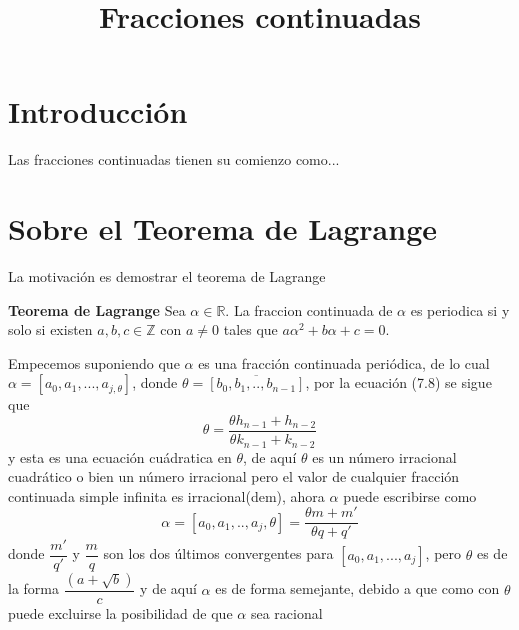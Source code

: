 \documentclass[11pt, article]{article}
\title{Fracciones continuadas}
\author{}
\date{}
\begin{document}
\maketitle
\thispagestyle{empty}
\section*{Introducción}
Las fracciones continuadas tienen su comienzo como...
\section*{Sobre el Teorema de Lagrange}
La motivación es demostrar el teorema de Lagrange

\textbf{Teorema de Lagrange} Sea $\alpha \in \mathbb{R}$. La fraccion continuada de $\alpha$ es periodica si y solo si existen $a, b, c \in\mathbb{Z}$ con $a\not=0$ tales que $a\alpha^2 + b\alpha + c = 0$.

Empecemos suponiendo que $\alpha$ es una fracción continuada periódica, de lo cual $\alpha= [a_0,a_1,...,a_{j,\theta}]$, donde $\theta=\overline{[b_0,b_1,..,b_{n-1}]}$, por la ecuación (7.8) se sigue que
\[
\theta =\dfrac{\theta h_{n-1}+h_{n-2}}{\theta k_{n-1}+k_{n-2}}
\]
y esta es una ecuación cuádratica en $\theta$, de aquí $\theta$ es un número irracional cuadrático o bien un número irracional pero el valor de cualquier fracción continuada simple infinita es irracional(dem), ahora $\alpha$ puede escribirse como 
\[
\alpha = [a_0,a_1,..,a_j,\theta]=\dfrac{\theta m + m'}{\theta q + q'}
\]
donde $\dfrac{m'}{q'}$ y $\dfrac{m}{q}$ son los dos últimos convergentes para $[a_0,a_1,...,a_j]$, pero $\theta$ es de la forma $\dfrac{(a + \sqrt{b})}{c}$ y de aquí $\alpha$ es de forma semejante, debido a que como con $\theta$ puede excluirse la posibilidad de que $\alpha$ sea racional
\end{document}
